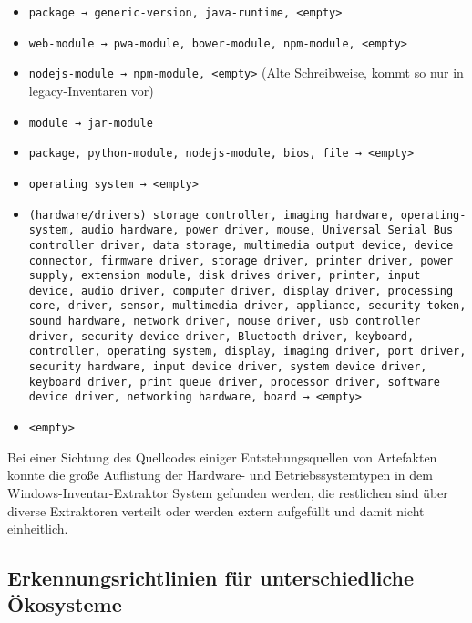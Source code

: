 \begin{itemize}
    \itemsep0em

    \item \texttt{package → generic-version, java-runtime, <empty>}
    \item \texttt{web-module → pwa-module, bower-module, npm-module, <empty>}
    \item \texttt{nodejs-module → npm-module, <empty>} (Alte Schreibweise, kommt so nur in legacy-Inventaren vor)
    \item \texttt{module → jar-module}
    \item \texttt{package, python-module, nodejs-module, bios, file → <empty>}
    \item \texttt{operating system → <empty>}
    \item \texttt{(hardware/drivers) storage controller, imaging hardware, operating-system, audio hardware, power driver, mouse, Universal Serial Bus controller driver, data storage, multimedia output device, device connector, firmware driver, storage driver, printer driver, power supply, extension module, disk drives driver, printer, input device, audio driver, computer driver, display driver, processing core, driver, sensor, multimedia driver, appliance, security token, sound hardware, network driver, mouse driver, usb controller driver, security device driver, Bluetooth driver, keyboard, controller, operating system, display, imaging driver, port driver, security hardware, input device driver, system device driver, keyboard driver, print queue driver, processor driver, software device driver, networking hardware, board → <empty>}
    \item \texttt{<empty>}
\end{itemize}

Bei einer Sichtung des Quellcodes einiger Entstehungsquellen von Artefakten konnte die große Auflistung der Hardware- und Betriebssystemtypen in dem Windows-Inventar-Extraktor System gefunden werden, die restlichen sind über diverse Extraktoren verteilt oder werden extern aufgefüllt und damit nicht einheitlich.

\subsection{Erkennungsrichtlinien für unterschiedliche Ökosysteme}\label{subsec:erkennung-typspezifische-artefakte}

